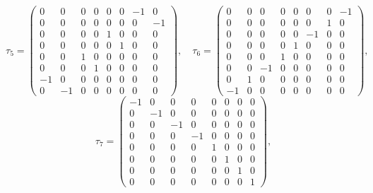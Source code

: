\documentclass[10pt,a4paper]{article}
\begin{document}
\begin{equation*}
\tau_5=\begin{pmatrix}0 & 0 & 0 & 0 & 0 & 0 & -1 & 0 \\ 0 & 0 & 0 & 0 & 0 & 0 & 0 & -1 \\ 0 & 0 & 0 & 0 & 1 & 0 & 0 & 0 \\ 0 & 0 & 0 & 0 & 0 & 1 & 0 & 0 \\ 0 & 0 & 1 & 0 & 0 & 0 & 0 & 0 \\ 0 & 0 & 0 & 1 & 0 & 0 & 0 & 0 \\ -1 & 0 & 0 & 0 & 0 & 0 & 0 & 0 \\ 0 & -1 & 0 & 0 & 0 & 0 & 0 & 0\end{pmatrix},\quad \tau_6=\begin{pmatrix}0 & 0 & 0 & 0 & 0 & 0 & 0 & -1 \\ 0 & 0 & 0 & 0 & 0 & 0 & 1 & 0 \\ 0 & 0 & 0 & 0 & 0 & -1 & 0 & 0 \\ 0 & 0 & 0 & 0 & 1 & 0 & 0 & 0 \\ 0 & 0 & 0 & 1 & 0 & 0 & 0 & 0 \\ 0 & 0 & -1 & 0 & 0 & 0 & 0 & 0 \\ 0 & 1 & 0 & 0 & 0 & 0 & 0 & 0 \\ -1 & 0 & 0 & 0 & 0 & 0 & 0 & 0\end{pmatrix},
\end{equation*}
\begin{equation*}
\tau_7=\begin{pmatrix}-1 & 0 & 0 & 0 & 0 & 0 & 0 & 0 \\ 0 & -1 & 0 & 0 & 0 & 0 & 0 & 0 \\ 0 & 0 & -1 & 0 & 0 & 0 & 0 & 0 \\ 0 & 0 & 0 & -1 & 0 & 0 & 0 & 0 \\ 0 & 0 & 0 & 0 & 1 & 0 & 0 & 0 \\ 0 & 0 & 0 & 0 & 0 & 1 & 0 & 0 \\ 0 & 0 & 0 & 0 & 0 & 0 & 1 & 0 \\ 0 & 0 & 0 & 0 & 0 & 0 & 0 & 1\end{pmatrix},
\end{equation*}
\end{document}
